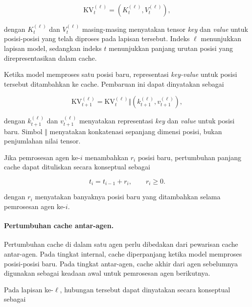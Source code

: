 \begin{equation}
    \mathrm{KV}_t^{(\ell)}
    =
    \left(K_t^{(\ell)},V_t^{(\ell)}\right),
    \label{eq:kv-layer-cache}
\end{equation}

dengan $K_t^{(\ell)}$ dan $V_t^{(\ell)}$ masing-masing menyatakan
tensor \textit{key} dan \textit{value} untuk posisi-posisi yang
telah diproses pada lapisan tersebut. Indeks $\ell$ menunjukkan
lapisan model, sedangkan indeks $t$ menunjukkan panjang urutan
posisi yang direpresentasikan dalam cache.

Ketika model memproses satu posisi baru, representasi
\textit{key-value} untuk posisi tersebut ditambahkan ke cache.
Pembaruan ini dapat dinyatakan sebagai

\begin{equation}
    \mathrm{KV}_{t+1}^{(\ell)}
    =
    \mathrm{KV}_t^{(\ell)}
    \Vert
    \left(k_{t+1}^{(\ell)},v_{t+1}^{(\ell)}\right),
    \label{eq:kv-cache-update}
\end{equation}

dengan $k_{t+1}^{(\ell)}$ dan $v_{t+1}^{(\ell)}$ menyatakan
representasi \textit{key} dan \textit{value} untuk posisi baru.
Simbol $\Vert$ menyatakan konkatenasi sepanjang dimensi posisi,
bukan penjumlahan nilai tensor.

Jika pemrosesan agen ke-$i$ menambahkan $r_i$ posisi baru,
pertumbuhan panjang cache dapat dituliskan secara konseptual sebagai

\begin{equation}
    t_i=t_{i-1}+r_i,
    \qquad r_i\geq 0.
    \label{eq:kv-position-growth}
\end{equation}

dengan $r_i$ menyatakan banyaknya posisi baru yang ditambahkan
selama pemrosesan agen ke-$i$. 


\paragraph{Pertumbuhan cache antar-agen.}

Pertumbuhan cache di dalam satu agen perlu dibedakan dari
pewarisan cache antar-agen. Pada tingkat internal, cache
diperpanjang ketika model memproses posisi-posisi baru. Pada
tingkat antar-agen, cache akhir dari agen sebelumnya digunakan
sebagai keadaan awal untuk pemrosesan agen berikutnya.

Pada lapisan ke-$\ell$, hubungan tersebut dapat dinyatakan
secara konseptual sebagai

